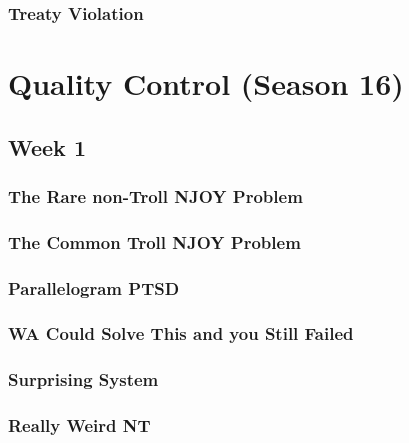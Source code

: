 \documentclass[titlepage=true]{scrartcl}
\begin{document}
	\subsubsection{Treaty Violation}
	\label{15.2.7}
	
	\newpage

\section{Quality Control (Season 16)}

    \subsection{Week 1}

    \subsubsection{The Rare non-Troll NJOY Problem}
	\label{16.1.1}
	
	\newpage

	\subsubsection{The Common Troll NJOY Problem}
	\label{16.1.2}
	
	\newpage

	\subsubsection{Parallelogram PTSD}
	\label{16.1.3}
	
	\newpage

	\subsubsection{WA Could Solve This and you Still Failed}
	\label{16.1.4}
	
	\newpage

    \subsubsection{Surprising System}
	\label{16.1.5}
	
	\newpage

	\subsubsection{Really Weird NT}
	\label{16.1.6}
	
	\newpage
\end{document}
